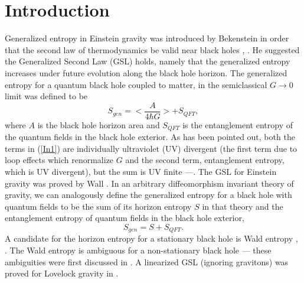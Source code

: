 \documentclass[12pt]{article}
\begin{document}
\section{Introduction}
Generalized entropy in Einstein gravity was introduced by Bekenstein in order that the second law of thermodynamics be valid near black holes \cite{JB}, \cite{JB2}. He suggested the Generalized Second Law (GSL) holds, namely that the generalized entropy increases under future evolution along the black hole horizon. The generalized entropy for a quantum black hole coupled to matter, in the semiclassical $G \to 0$ limit was defined to be
\begin{equation}\label{In1}
S_{gen} = <\frac{A}{4\hbar G}> + S_{QFT},
\end{equation}
where $A$ is the black hole horizon area and $S_{QFT}$ is the entanglement entropy of the quantum fields in the black hole exterior. As has been pointed out, both the terms in (\ref{In1}) are individually ultraviolet (UV) divergent (the first term due to loop effects which renormalize $G$ and the second term, entanglement entropy, which is UV divergent), but the sum is UV finite \cite{SU}---\cite{gesteau}. The GSL for Einstein gravity was proved by Wall \cite{AW}.
In an arbitrary diffeomorphism invariant theory of gravity, we can analogously define the generalized entropy for a black hole with quantum fields to be the sum of its horizon entropy $S$ in that theory and the entanglement entropy of quantum fields in the black hole exterior,
\begin{equation}
S_{gen} = S + S_{QFT}.
\end{equation}
A candidate for the horizon entropy for a stationary black hole is Wald entropy \cite{Wald}, \cite{VR}. The Wald entropy is ambiguous for a non-stationary black hole --- these ambiguities were first discussed in \cite{JKM}. A linearized GSL (ignoring gravitons) was proved for Lovelock gravity in \cite{SW}.
\end{document}
